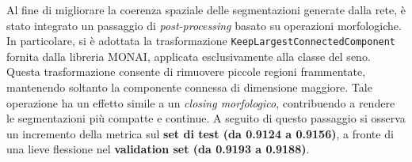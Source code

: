 
Al fine di migliorare la coerenza spaziale delle segmentazioni generate dalla rete, è stato integrato un passaggio di \textit{post-processing} basato su operazioni morfologiche. In particolare, si è adottata la trasformazione \texttt{KeepLargestConnectedComponent} fornita dalla libreria MONAI, applicata esclusivamente alla classe del seno. Questa trasformazione consente di rimuovere piccole regioni frammentate, mantenendo soltanto la componente connessa di dimensione maggiore. Tale operazione ha un effetto simile a un \textit{closing morfologico}, contribuendo a rendere le segmentazioni più compatte e continue. A seguito di questo passaggio si osserva un incremento della metrica sul \textbf{set di test (da 0.9124 a 0.9156)}, a fronte di una lieve flessione nel \textbf{validation set (da 0.9193 a 0.9188)}.
